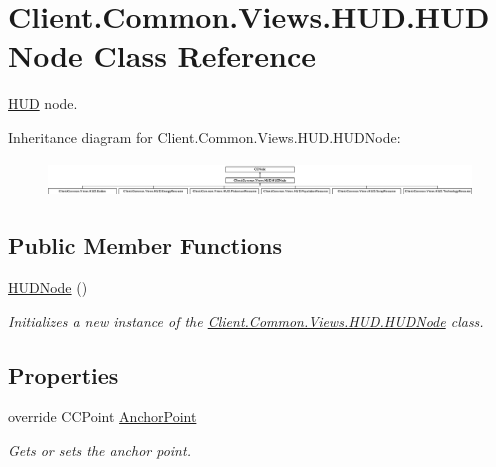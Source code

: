 \hypertarget{classClient_1_1Common_1_1Views_1_1HUD_1_1HUDNode}{}\section{Client.\+Common.\+Views.\+H\+U\+D.\+H\+U\+D\+Node Class Reference}
\label{classClient_1_1Common_1_1Views_1_1HUD_1_1HUDNode}


\hyperlink{namespaceClient_1_1Common_1_1Views_1_1HUD}{H\+U\+D} node.  


Inheritance diagram for Client.\+Common.\+Views.\+H\+U\+D.\+H\+U\+D\+Node\+:\begin{figure}[H]
\begin{center}
\leavevmode
\includegraphics[height=0.945946cm]{classClient_1_1Common_1_1Views_1_1HUD_1_1HUDNode}
\end{center}
\end{figure}
\subsection*{Public Member Functions}
\begin{DoxyCompactItemize}
\item 
\hyperlink{classClient_1_1Common_1_1Views_1_1HUD_1_1HUDNode_a1c49d5a0939ad7e271a9633a8ddaf319}{H\+U\+D\+Node} ()
\begin{DoxyCompactList}\small\item\em Initializes a new instance of the \hyperlink{classClient_1_1Common_1_1Views_1_1HUD_1_1HUDNode}{Client.\+Common.\+Views.\+H\+U\+D.\+H\+U\+D\+Node} class. \end{DoxyCompactList}\end{DoxyCompactItemize}
\subsection*{Properties}
\begin{DoxyCompactItemize}
\item 
override C\+C\+Point \hyperlink{classClient_1_1Common_1_1Views_1_1HUD_1_1HUDNode_a76667e493493bf7a449a559bd6da0c36}{Anchor\+Point}
\begin{DoxyCompactList}\small\item\em Gets or sets the anchor point. \end{DoxyCompactList}\end{DoxyCompactItemize}


